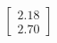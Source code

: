 \documentclass[preview]{standalone}
\begin{document}
\begin{align*}
\begin{bmatrix} 2.18 \\ 2.70 \end{bmatrix}
\end{align*}
\end{document}
